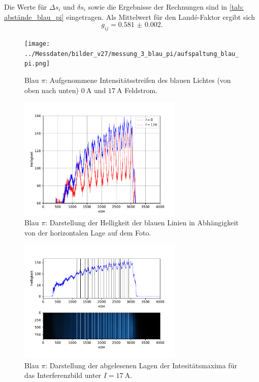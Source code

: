 Die Werte für $\Delta s_i$ und $\delta s_i$ sowie die Ergebnisse der Rechnungen sind in \autoref{tab: abstände_blau_pi} eingetragen.
Als Mittelwert für den Landé-Faktor ergibt sich
\begin{equation}
  g_{ij} = \num{0.581(2)}.
\end{equation}
\begin{figure}
  \centering
  \texttt{[image: ../Messdaten/bilder\_v27/messung\_3\_blau\_pi/aufspaltung\_blau\_pi.png]}
  \caption{Blau $\pi$: Aufgenommene Intensitätsstreifen des blauen Lichtes (von oben nach unten) $\SI{0}{\ampere}$ und $\SI{17}{\ampere}$ Feldstrom.}
  \label{fig: aufspaltung_blau_pi}
\end{figure}
\begin{figure}
  \centering
  \includegraphics[width = 0.7\textwidth]{../Messdaten/plots/blau_pi_intensitaet.pdf}
  \caption{Blau $\pi$: Darstellung der Helligkeit der blauen Linien in Abhängigkeit von der horizontalen Lage auf dem Foto.}
  \label{fig: blau_intensität_pi}
\end{figure}

\begin{figure}
  \centering
  \includegraphics[width = 0.7\textwidth]{../Messdaten/plots/peaks_blau_pi_17.pdf}
  \caption{Blau $\pi$: Darstellung der abgelesenen Lagen der Intesitätsmaxima für das Interferenzbild unter $I =\SI{17}{\ampere}$.}
  \label{fig: peaks_blau_pi_17}
\end{figure}

